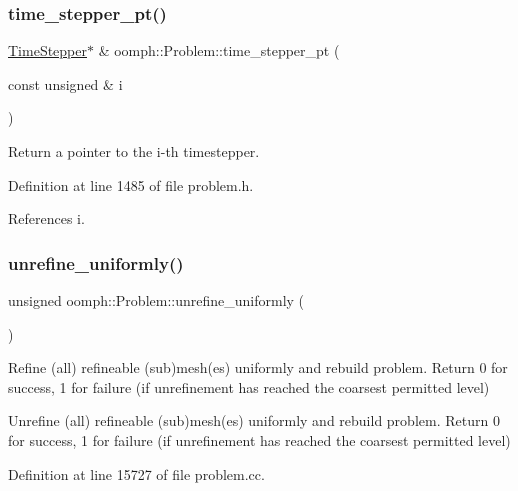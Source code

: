 \subsubsection{\texorpdfstring{time\+\_\+stepper\+\_\+pt()}{time\_stepper\_pt()}\hspace{0.1cm}{\footnotesize\ttfamily [3/3]}}
{\footnotesize\ttfamily \hyperlink{classoomph_1_1TimeStepper}{Time\+Stepper}$\ast$ \& oomph\+::\+Problem\+::time\+\_\+stepper\+\_\+pt (\begin{DoxyParamCaption}\item[{const unsigned \&}]{i }\end{DoxyParamCaption})\hspace{0.3cm}{\ttfamily [inline]}}



Return a pointer to the i-\/th timestepper. 



Definition at line 1485 of file problem.\+h.



References i.

\mbox{\label{classoomph_1_1Problem_a10dae99dec2f8202887f4e49e175f39c}} 
\subsubsection{\texorpdfstring{unrefine\+\_\+uniformly()}{unrefine\_uniformly()}\hspace{0.1cm}{\footnotesize\ttfamily [1/2]}}
{\footnotesize\ttfamily unsigned oomph\+::\+Problem\+::unrefine\+\_\+uniformly (\begin{DoxyParamCaption}{ }\end{DoxyParamCaption})}



Refine (all) refineable (sub)mesh(es) uniformly and rebuild problem. Return 0 for success, 1 for failure (if unrefinement has reached the coarsest permitted level) 

Unrefine (all) refineable (sub)mesh(es) uniformly and rebuild problem. Return 0 for success, 1 for failure (if unrefinement has reached the coarsest permitted level) 

Definition at line 15727 of file problem.\+cc.



